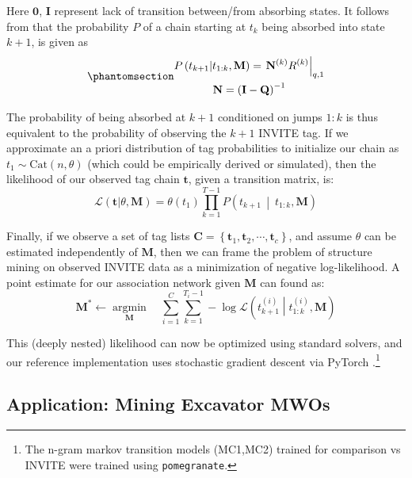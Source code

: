\documentclass[%
	12pt,
		oneside,
		letterpaper
]{book}
\begin{document}
Here \(\mathbf{0}\), \(\mathbf{I}\) represent lack of transition between/from absorbing states.
It follows from \autocite{RandomWalksElectric_Doyle2000} that the probability \(P\) of a chain starting at \(t_k\) being absorbed into state \(k+1\), is given as
\begin{equation}\phantomsection\label{eq-absorb}{
\begin{gathered}
    P\left(t_{k+1} \middle| t_{1:k},\mathbf{M}\right) =
        \left.\mathbf{N}^{(k)}R^{(k)}\right|_{q,1}\\
\mathbf{N} = \left( \mathbf{I}-\mathbf{Q} \right) ^{-1}
\end{gathered}
}\end{equation}

The probability of being absorbed at \(k+1\) conditioned on jumps \(1:k\) is thus equivalent to the probability of observing the \(k+1\) INVITE tag.
If we approximate an a priori distribution of tag probabilities to initialize our chain as \(t_1\sim\text{Cat}(n,\theta)\) (which could be empirically derived or simulated), then the likelihood of our observed tag chain \(\mathbf{t}\), given a transition matrix, is:
\[
\mathcal{L}\left(\mathbf{t}| \theta, \mathbf{M}\right) =
        \theta(t_1)\prod_{k=1}^{T-1} P\left(t_{k+1}\,\middle|\ t_{1:k},\mathbf{M}\right)
\]

Finally, if we observe a set of tag lists \(\mathbf{C} = \left\{ \mathbf{t}_1, \mathbf{t}_2, \cdots, \mathbf{t}_{c} \right\}\), and assume \(\theta\) can be estimated independently of \(\mathbf{M}\), then we can frame the problem of structure mining on observed INVITE data as a minimization of negative log-likelihood.
A point estimate for our association network given \(\mathbf{M}\) can found as:
\[
    \mathbf{M}^* \leftarrow \operatorname*{argmin}_{\mathbf{M}} \quad
    \sum_{i=1}^{C}
    \sum_{k=1}^{T_i-1}
        -\log \mathcal{L} \left(t^{(i)}_{k+1} \middle| t^{(i)}_{1:k},\mathbf{M}\right)
\]

This (deeply nested) likelihood can now be optimized using standard solvers, and our reference implementation uses stochastic gradient descent via PyTorch \autocite{AutomaticdifferentiationPyTorch_Paszke2017}.\footnote{
  The n-gram markov transition models (MC1,MC2) trained for comparison vs INVITE were trained using \texttt{pomegranate}\autocite{Pomegranatefastflexible_Schreiber2018}.}

\subsection{Application: Mining Excavator MWOs}\label{application-mining-excavator-mwos}
\end{document}
